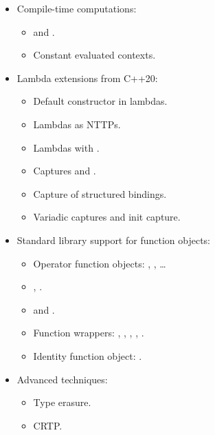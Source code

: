 \begin{itemize}
  \item Compile-time computations:
    \begin{itemize}
      \item {} and .
      \item Constant evaluated contexts.
    \end{itemize}
  \item Lambda extensions from C++20:
    \begin{itemize}
      \item Default constructor in lambdas.
      \item Lambdas as NTTPs.
      \item Lambdas with .
      \item Captures \cppkey{[=,this]} and \cppkey{[*this]}.
      \item Capture of structured bindings.
      \item Variadic captures and init capture.
    \end{itemize}
  \item Standard library support for function objects:
    \begin{itemize}
      \item Operator function objects: , , \ldots
      \item {}, .
      \item {} and .
      \item Function wrappers: , , 
            , , .
      \item Identity function object: .
    \end{itemize}
  \item Advanced techniques:
    \begin{itemize}
      \item Type erasure.
      \item CRTP.
    \end{itemize}
\end{itemize}
